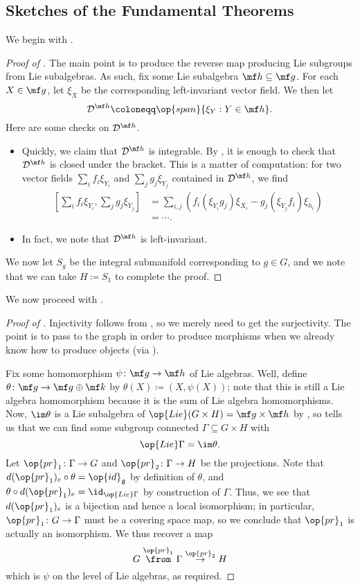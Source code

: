 \documentclass[../notes.tex]{subfiles}
\begin{document}
\subsection{Sketches of the Fundamental Theorems}
We begin with .
\begin{proof}[Proof of ]
	The main point is to produce the reverse map producing Lie subgroups from Lie subalgebras. As such, fix some Lie subalgebra $\mf h\subseteq\mf g$. For each $X\in\mf g$, let $\xi_X$ be the corresponding left-invariant vector field. We then let
	\[\mathcal D^{\mf h}\coloneqq\op{span}\{\xi_Y:Y\in\mf h\}.\]
	Here are some checks on $\mathcal D^{\mf h}$.
	\begin{itemize}
		\item Quickly, we claim that $\mathcal D^{\mf h}$ is integrable. By , it is enough to check that $\mathcal D^{\mf h}$ is closed under the bracket. This is a matter of computation: for two vector fields $\sum_if_i\xi_{Y_i}$ and $\sum_jg_j\xi_{Y_j}$ contained in $\mathcal D^{\mf h}$, we find
		\begin{align*}
			\left[\sum_if_i\xi_{Y_i},\sum_jg_j\xi_{Y_j}\right] &= \sum_{i,j}\left(f_i(\xi_{Y_i}g_j)\xi_{X_i}-g_j(\xi_{Y_j}f_i)\xi_{h_i}\right) \\
			&= \cdots.
		\end{align*}
		\item In fact, we note that $\mathcal D^{\mf h}$ is left-invariant.
	\end{itemize}
	We now let $S_g$ be the integral submanifold corresponding to $g\in G$, and we note that we can take $H\coloneqq S_1$ to complete the proof.
\end{proof}
We now proceed with .
\begin{proof}[Proof of ]
	Injectivity follows from , so we merely need to get the surjectivity. The point is to pass to the graph in order to produce morphisms when we already know how to produce objects (via ).
	
	Fix some homomorphism $\psi\colon\mf g\to\mf h$ of Lie algebras. Well, define $\theta\colon\mf g\to\mf g\oplus\mf k$ by $\theta(X)\coloneqq(X,\psi(X))$; note that this is still a Lie algebra homomorphism because it is the sum of Lie algebra homomorphisms. Now, $\im\theta$ is a Lie subalgebra of $\op{Lie}(G\times H)=\mf g\times\mf h$ by , so  tells us that we can find some subgroup connected $\Gamma\subseteq G\times H$ with
	\[\op{Lie}\Gamma=\im\theta.\]
	Let $\op{pr}_1\colon\Gamma\to G$ and $\op{pr}_2\colon\Gamma\to H$ be the projections. Note that $d({\op{pr}_1})_e\circ\theta={\op{id}_{\mathfrak g}}$ by definition of $\theta$, and $\theta\circ d({\op{pr}_1})_e=\id_{\op{Lie}\Gamma}$ by construction of $\Gamma$. Thus, we see that $d(\op{pr}_1)_e$ is a bijection and hence a local isomorphism; in particular, $\op{pr}_1\colon G\to\Gamma$ must be a covering space map, so we conclude that $\op{pr}_1$ is actually an isomorphism. We thus recover a map
	\[G\stackrel{\op{pr}_1}\from\Gamma\stackrel{\op{pr}_2}\to H\]
	which is $\psi$ on the level of Lie algebras, as required.
\end{proof}
\end{document}
